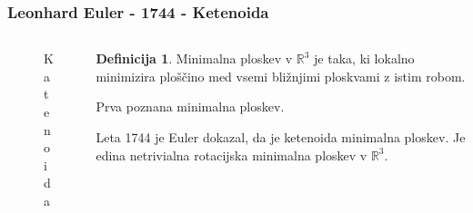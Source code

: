 \documentclass[8pt]{beamer}
\newcommand{\samplescalar}{50} %
\theoremstyle{definition}
\newtheorem{definicija}{Definicija}
\theoremstyle{remark}
\theoremstyle{plain}
\numberwithin{equation}{section}  %
\begin{document}
\begin{frame}
    \frametitle{Leonhard Euler - 1744 - Ketenoida}
    \begin{columns}
        \begin{column}{0.5\textwidth}
            \centering
            \begin{figure}[H]
                \centering
            
                \caption{Katenoida}
            \end{figure}

        \end{column}

        \begin{column}{0.5\textwidth}
            \begin{definicija}
                Minimalna ploskev v $\mathbb{R}^3$ je taka, ki \textcolor{red1}{lokalno minimizira ploščino} med vsemi bližnjimi ploskvami z istim robom.
            \end{definicija}
            Prva poznana minimalna ploskev. 

            \vspace{0.8em}

            Leta 1744 je Euler dokazal, da je ketenoida minimalna ploskev. Je edina netrivialna \textcolor{red1}{rotacijska minimalna ploskev} v $\mathbb{R}^3$. 
            

\end{column}
\end{columns}
\end{frame}
\end{document}

